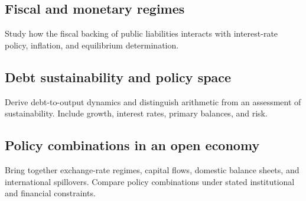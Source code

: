\label{sec:policy-interaction}

\subsection{Fiscal and monetary regimes}
Study how the fiscal backing of public liabilities interacts with interest-rate
policy, inflation, and equilibrium determination.

\subsection{Debt sustainability and policy space}
Derive debt-to-output dynamics and distinguish arithmetic from an assessment of
sustainability. Include growth, interest rates, primary balances, and risk.

\subsection{Policy combinations in an open economy}
Bring together exchange-rate regimes, capital flows, domestic balance sheets,
and international spillovers. Compare policy combinations under stated
institutional and financial constraints.
